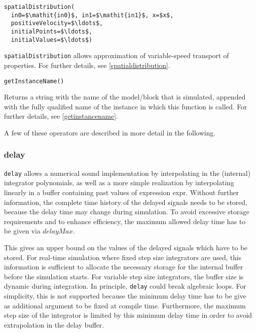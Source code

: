 \begin{operatordefinition}[spatialDistribution]
\begin{synopsis}\begin{lstlisting}
spatialDistribution(
  in0=$\mathit{in0}$, in1=$\mathit{in1}$, x=$x$,
  positiveVelocity=$\ldots$,
  initialPoints=$\ldots$,
  initialValues=$\ldots$)
\end{lstlisting}\end{synopsis}
\begin{semantics}
\lstinline!spatialDistribution! allows approximation of variable-speed transport of properties.  For further details, see \cref{spatialdistribution}.
\end{semantics}
\end{operatordefinition}

\begin{operatordefinition}[getInstanceName]
\begin{synopsis}\begin{lstlisting}
getInstanceName()
\end{lstlisting}\end{synopsis}
\begin{semantics}
Returns a string with the name of the model/block that is simulated, appended with the fully qualified name of the instance in which this function is called.  For further details, see \cref{getinstancename}.
\end{semantics}
\end{operatordefinition}

A few of these operators are described in more detail in the following.

\subsubsection{delay}\label{delay}

\begin{nonnormative}
\lstinline!delay! allows a numerical sound
implementation by interpolating in the (internal) integrator
polynomials, as well as a more simple realization by interpolating
linearly in a buffer containing past values of expression expr. Without
further information, the complete time history of the delayed signals
needs to be stored, because the delay time may change during simulation.
To avoid excessive storage requirements and to enhance efficiency, the
maximum allowed delay time has to be given via $\mathit{delayMax}$.

This gives an upper bound on the values of the delayed signals
which have to be stored. For real-time simulation where fixed step size
integrators are used, this information is sufficient to allocate the
necessary storage for the internal buffer before the simulation starts.
For variable step size integrators, the buffer size is dynamic during
integration. In principle, \lstinline!delay! could break algebraic
loops. For simplicity, this is not supported because the minimum delay
time has to be give as additional argument to be fixed at compile time.
Furthermore, the maximum step size of the integrator is limited by this
minimum delay time in order to avoid extrapolation in the delay
buffer.
\end{nonnormative}


